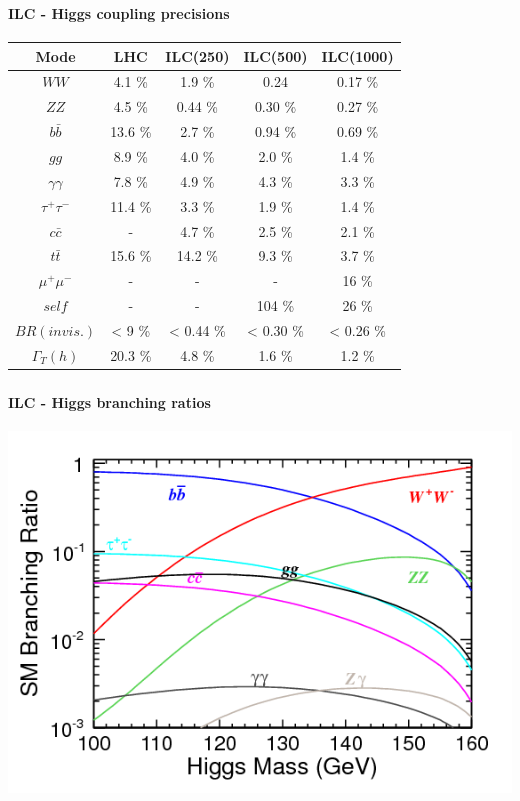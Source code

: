 \documentclass[8pt]{beamer}
\begin{document}
  \begin{frame}
  \frametitle{\backup}
  \framesubtitle{ILC - Higgs coupling precisions}
    \begin{center}
      \begin{tabular}{c c c c c}
        Mode           & LHC     & ILC(250)  & ILC(500)  & ILC(1000) \\ \hline
        $WW$           & 4.1 \%  & 1.9 \%    & 0.24      & 0.17 \% \\
        $ZZ$           & 4.5 \%  & 0.44 \%   & 0.30 \%   & 0.27 \% \\
        $b\bar{b}$     & 13.6 \% & 2.7 \%    & 0.94 \%   & 0.69 \% \\
        $gg$           & 8.9 \%  & 4.0 \%    & 2.0 \%    & 1.4 \% \\
        $\gamma\gamma$ & 7.8 \%  & 4.9 \%    & 4.3 \%    & 3.3 \% \\
        $\tau^+\tau^-$ & 11.4 \% & 3.3 \%    & 1.9 \%    & 1.4 \% \\
        $c\bar{c}$     & -       & 4.7 \%    & 2.5 \%    & 2.1 \% \\
        $t\bar{t}$     & 15.6 \% & 14.2 \%   & 9.3 \%    & 3.7 \% \\
        $\mu^+\mu^-$   & -       & -         & -         & 16 \% \\
        $self$         & -       & -         & 104 \%    & 26 \% \\ \hline
        $BR(invis.)$   & < 9 \%  & < 0.44 \% & < 0.30 \% & < 0.26 \% \\
        $\Gamma_T(h)$  & 20.3 \% & 4.8 \%    & 1.6 \%    & 1.2 \% \\ \hline
      \end{tabular}
    \end{center}
  \end{frame}

  \begin{frame}
  \frametitle{\backup}
  \framesubtitle{ILC - Higgs branching ratios}
    \begin{center}
      \includegraphics[width=\linewidth]{HiggsBRs.png}
    \end{center}
  \end{frame}
\end{document}
